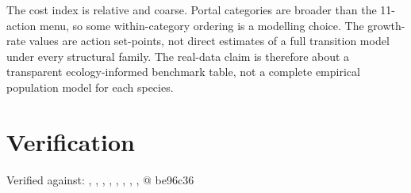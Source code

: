 \documentclass[11pt]{article}
\begin{document}
The cost index is relative and coarse. Portal categories are broader than the
11-action menu, so some within-category ordering is a modelling choice. The
growth-rate values are action set-points, not direct estimates of a full
transition model under every structural family. The real-data claim is therefore
about a transparent ecology-informed benchmark table, not a complete empirical
population model for each species.

\section*{Verification}

Verified against: , , , , , , , ,  @ be96c36
\end{document}
